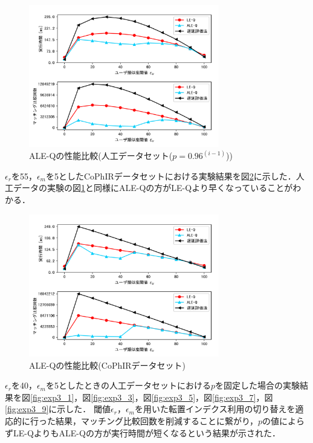 \begin{figure}[H]
    \centering
    \includegraphics[width=8.3cm]{eimg/exp3.png}
    \caption{ALE-Qの性能比較(人工データセット($p=0.96^{(i-1)}$))}
    \label{fig:exp3}
\end{figure}
$\epsilon_r$を55，$\epsilon_m$を5としたCoPhIRデータセットにおける実験結果を図\ref{fig:exp3_c}に示した．人工データの実験の図\ref{fig:exp3}と同様にALE-Qの方がLE-Qより早くなっていることがわかる．
\begin{figure}[H]
    \centering
    \includegraphics[width=8.3cm]{eimg/exp3_c.png}
    \caption{ALE-Qの性能比較(CoPhIRデータセット)}
    \label{fig:exp3_c}
\end{figure}

$\epsilon_r$を40，$\epsilon_m$を5としたときの人工データセットにおける$p$を固定した場合の実験結果を図\ref{fig:exp3_1}，図\ref{fig:exp3_3}，図\ref{fig:exp3_5}，図\ref{fig:exp3_7}，図\ref{fig:exp3_9}に示した．
閾値$\epsilon_r$，$\epsilon_m$を用いた転置インデクス利用の切り替えを適応的に行った結果，マッチング比較回数を削減することに繋がり，$p$の値によらずLE-QよりもALE-Qの方が実行時間が短くなるという結果が示された．

